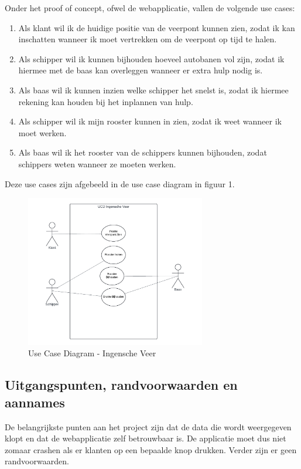 \documentclass{article}
\begin{document}
Onder het proof of concept, ofwel de webapplicatie, vallen de volgende use cases:
\begin{enumerate}
    \item Als klant wil ik de huidige positie van de veerpont kunnen zien, zodat ik kan inschatten wanneer ik moet vertrekken om de veerpont op tijd te halen.
    \item Als schipper wil ik kunnen bijhouden hoeveel autobanen vol zijn, zodat ik hiermee met de baas kan overleggen wanneer er extra hulp nodig is.
    \item Als baas wil ik kunnen inzien welke schipper het snelst is, zodat ik hiermee rekening kan houden bij het inplannen van hulp.
    \item Als schipper wil ik mijn rooster kunnen in zien, zodat ik weet wanneer ik moet werken.
    \item Als baas wil ik het rooster van de schippers kunnen bijhouden, zodat schippers weten wanneer ze moeten werken.
\end{enumerate}
\par\smallskip
Deze use cases zijn afgebeeld in de use case diagram in figuur 1.
\begin{figure}[h]
    \centering
    \label{fig:ucd}
    \includegraphics[width=0.7\textwidth]{images/iv_ucd.png}
    \caption{Use Case Diagram - Ingensche Veer}
\end{figure}
\pagebreak

\subsection{Uitgangspunten, randvoorwaarden en aannames}
De belangrijkste punten aan het project zijn dat de data die wordt weergegeven klopt en dat de webapplicatie zelf betrouwbaar is. De applicatie moet dus niet zomaar crashen als er klanten op een bepaalde knop drukken.
Verder zijn er geen randvoorwaarden.
\end{document}
